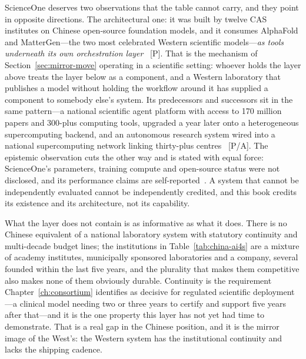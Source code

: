 ScienceOne deserves two observations that the table cannot carry, and they point in opposite directions. The architectural one: it was built by twelve CAS institutes on Chinese open-source foundation models, and it consumes AlphaFold and MatterGen---the two most celebrated Western scientific models---\emph{as tools underneath its own orchestration layer}~\cite{cas-scienceone} [P]. That is the mechanism of Section~\ref{sec:mirror-move} operating in a scientific setting: whoever holds the layer above treats the layer below as a component, and a Western laboratory that publishes a model without holding the workflow around it has supplied a component to somebody else's system. Its predecessors and successors sit in the same pattern---a national scientific agent platform with access to 170 million papers and 300-plus computing tools, upgraded a year later onto a heterogeneous supercomputing backend, and an autonomous research system wired into a national supercomputing network linking thirty-plus centres~\cite{scienceone,scienceone2,scnet} [P/A]. The epistemic observation cuts the other way and is stated with equal force: ScienceOne's parameters, training compute and open-source status were not disclosed, and its performance claims are self-reported~\cite{cas-scienceone}. A system that cannot be independently evaluated cannot be independently credited, and this book credits its existence and its architecture, not its capability.

What the layer does not contain is as informative as what it does. There is no Chinese equivalent of a national laboratory system with statutory continuity and multi-decade budget lines; the institutions in Table~\ref{tab:china-ai4s} are a mixture of academy institutes, municipally sponsored laboratories and a company, several founded within the last five years, and the plurality that makes them competitive also makes none of them obviously durable. Continuity is the requirement Chapter~\ref{ch:consortium} identifies as decisive for regulated scientific deployment---a clinical model needing two or three years to certify and support five years after that---and it is the one property this layer has not yet had time to demonstrate. That is a real gap in the Chinese position, and it is the mirror image of the West's: the Western system has the institutional continuity and lacks the shipping cadence.

